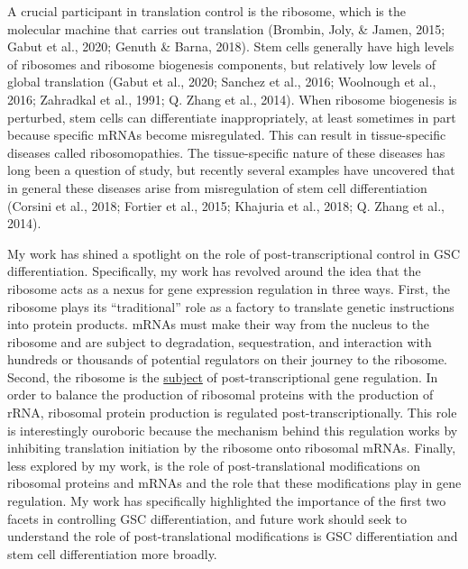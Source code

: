 \documentclass[12pt,oneside]{reedthesis}
\begin{document}
A crucial participant in translation control is the ribosome, which is the molecular machine that carries out translation (Brombin, Joly, \& Jamen, 2015; Gabut et al., 2020; Genuth \& Barna, 2018). Stem cells generally have high levels of ribosomes and ribosome biogenesis components, but relatively low levels of global translation (Gabut et al., 2020; Sanchez et al., 2016; Woolnough et al., 2016; Zahradkal et al., 1991; Q. Zhang et al., 2014). When ribosome biogenesis is perturbed, stem cells can differentiate inappropriately, at least sometimes in part because specific mRNAs become misregulated. This can result in tissue-specific diseases called ribosomopathies. The tissue-specific nature of these diseases has long been a question of study, but recently several examples have uncovered that in general these diseases arise from misregulation of stem cell differentiation (Corsini et al., 2018; Fortier et al., 2015; Khajuria et al., 2018; Q. Zhang et al., 2014).

My work has shined a spotlight on the role of post-transcriptional control in GSC differentiation. Specifically, my work has revolved around the idea that the ribosome acts as a nexus for gene expression regulation in three ways. First, the ribosome plays its ``traditional'' role as a factory to translate genetic instructions into protein products. mRNAs must make their way from the nucleus to the ribosome and are subject to degradation, sequestration, and interaction with hundreds or thousands of potential regulators on their journey to the ribosome. Second, the ribosome is the \underline{subject} of post-transcriptional gene regulation. In order to balance the production of ribosomal proteins with the production of rRNA, ribosomal protein production is regulated post-transcriptionally. This role is interestingly ouroboric because the mechanism behind this regulation works by inhibiting translation initiation by the ribosome onto ribosomal mRNAs. Finally, less explored by my work, is the role of post-translational modifications on ribosomal proteins and mRNAs and the role that these modifications play in gene regulation. My work has specifically highlighted the importance of the first two facets in controlling GSC differentiation, and future work should seek to understand the role of post-translational modifications is GSC differentiation and stem cell differentiation more broadly.
\end{document}

